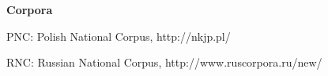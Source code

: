 \documentclass[output=paper,colorlinks,citecolor=brown]{langscibook}
\begin{document}
\printbibliography[heading=subbibliography,notkeyword=this]
\noindent \Large\textbf{Corpora} \\

\normalsize

\noindent PNC:	Polish National Corpus, http://nkjp.pl/

\noindent RNC:	Russian National Corpus, http://www.ruscorpora.ru/new/
\end{document}

